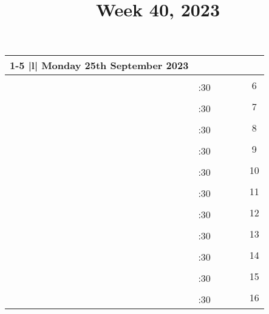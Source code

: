 \documentclass[10pt, a5paper, final, oneside]{memoir}
\title{Week 40, 2023}
\author{}
\date{}
\newcommand{\grayline}{\arrayrulecolor{lightgray}\cline{1-5}\arrayrulecolor{black}}
\begin{document}
\frontmatter
\maketitle
\mainmatter

\noindent
\begin{tabularx}{\linewidth}{|c|c|X|X|X|c}

    \cline{1-5}
    \multicolumn{5} {|l|} {Monday 25th September 2023} \\
    \hline

    & & & && \multirow{2}{*}{6}\\ 
    \grayline
    & :30 & & &&\\ \hline

    & & & && \multirow{2}{*}{7}\\ 
    \grayline
    & :30 & & &&\\ \hline

    & & & && \multirow{2}{*}{8}\\ 
    \grayline
    & :30 & & &&\\ \hline

    & & & && \multirow{2}{*}{9}\\ 
    \grayline
    & :30 & & &&\\ \hline
    
    & & & && \multirow{2}{*}{10}\\ 
    \grayline
    & :30 & & &&\\ \hline

    & & & && \multirow{2}{*}{11}\\ 
    \grayline
    & :30 & & &&\\ \hline

    & & & && \multirow{2}{*}{12}\\ 
    \grayline
    & :30 & & &&\\ \hline

    & & & && \multirow{2}{*}{13}\\ 
    \grayline
    & :30 & & &&\\ \hline

    & & & && \multirow{2}{*}{14}\\ 
    \grayline
    & :30 & & &&\\ \hline
    
    & & & && \multirow{2}{*}{15}\\ 
    \grayline
    & :30 & & &&\\ \hline

    & & & && \multirow{2}{*}{16}\\ 
    \grayline
    & :30 & & &&\\ \hline


\end{tabularx}
\end{document}
